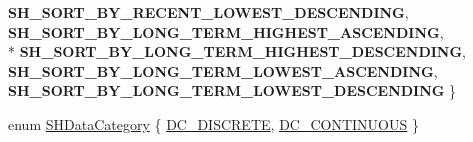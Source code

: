 \begin{DoxyCompactItemize}
{\bfseries S\-H\-\_\-\-S\-O\-R\-T\-\_\-\-B\-Y\-\_\-\-R\-E\-C\-E\-N\-T\-\_\-\-L\-O\-W\-E\-S\-T\-\_\-\-D\-E\-S\-C\-E\-N\-D\-I\-N\-G}, 
{\bfseries S\-H\-\_\-\-S\-O\-R\-T\-\_\-\-B\-Y\-\_\-\-L\-O\-N\-G\-\_\-\-T\-E\-R\-M\-\_\-\-H\-I\-G\-H\-E\-S\-T\-\_\-\-A\-S\-C\-E\-N\-D\-I\-N\-G}, 
\\*
{\bfseries S\-H\-\_\-\-S\-O\-R\-T\-\_\-\-B\-Y\-\_\-\-L\-O\-N\-G\-\_\-\-T\-E\-R\-M\-\_\-\-H\-I\-G\-H\-E\-S\-T\-\_\-\-D\-E\-S\-C\-E\-N\-D\-I\-N\-G}, 
{\bfseries S\-H\-\_\-\-S\-O\-R\-T\-\_\-\-B\-Y\-\_\-\-L\-O\-N\-G\-\_\-\-T\-E\-R\-M\-\_\-\-L\-O\-W\-E\-S\-T\-\_\-\-A\-S\-C\-E\-N\-D\-I\-N\-G}, 
{\bfseries S\-H\-\_\-\-S\-O\-R\-T\-\_\-\-B\-Y\-\_\-\-L\-O\-N\-G\-\_\-\-T\-E\-R\-M\-\_\-\-L\-O\-W\-E\-S\-T\-\_\-\-D\-E\-S\-C\-E\-N\-D\-I\-N\-G}
 \}
\item 
enum \hyperlink{class_rak_net_1_1_statistics_history_a197b0da149b5168c77891e3f9d289a0b}{S\-H\-Data\-Category} \{ \hyperlink{class_rak_net_1_1_statistics_history_a197b0da149b5168c77891e3f9d289a0ba98c350223aab0b252a92a03a4657b251}{D\-C\-\_\-\-D\-I\-S\-C\-R\-E\-T\-E}, 
\hyperlink{class_rak_net_1_1_statistics_history_a197b0da149b5168c77891e3f9d289a0ba2540de6b5166cf35499dbfeb15b96d98}{D\-C\-\_\-\-C\-O\-N\-T\-I\-N\-U\-O\-U\-S}
 \}
\end{DoxyCompactItemize}
